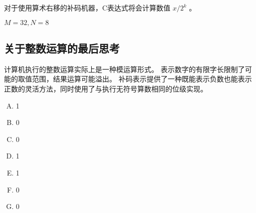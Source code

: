 {{        对于使用算术右移的补码机器，C表达式将会计算数值 $x / 2^k$ 。

        \begin{practicec}

        \end{practicec}

        \begin{practicec}
            $M = 32, N = 8$
        \end{practicec}
    }

    \subsection{关于整数运算的最后思考}
    {
        计算机执行的整数运算实际上是一种模运算形式。
        表示数字的有限字长限制了可能的取值范围，结果运算可能溢出。
        补码表示提供了一种既能表示负数也能表示正数的灵活方法，同时使用了与执行无符号算数相同的位级实现。

        \begin{practicec}
            \begin{enumerate}[A.]
                \item 1
                \item 0
                \item 0
                \item 1
                \item 1
                \item 0
                \item 0
            \end{enumerate}
        \end{practicec}
    }
}

